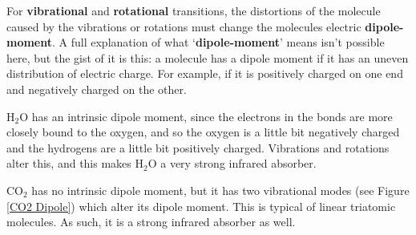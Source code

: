 For \textbf{vibrational} and \textbf{rotational} transitions, the distortions of the molecule caused by the vibrations or rotations must change the molecules electric \textbf{dipole-moment}. A full explanation of what `\textbf{dipole-moment}' means isn't possible here, but the gist of it is this: a molecule has a dipole moment if it has an uneven distribution of electric charge. For example, if it is positively charged on one end and negatively charged on the other.

H$_2$O has an intrinsic dipole moment, since the electrons in the bonds are more closely bound to the oxygen, and so the oxygen is a little bit negatively charged and the hydrogens are a little bit positively charged. Vibrations and rotations alter this, and this makes H$_2$O a very strong infrared absorber.

CO$_2$ has no intrinsic dipole moment, but it has two vibrational modes (see Figure \ref{CO2 Dipole}) which alter its dipole moment. This is typical of linear triatomic molecules. As such, it is a strong infrared absorber as well.

